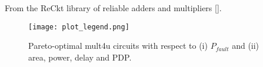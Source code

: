 \pagebreak

From the ReCkt library of reliable adders and multipliers [\cite{reckt_2021_umar}].

\begin{figure*}[htb]
\centering
{}
\hfil
{}
\hfil
\texttt{[image: plot\_legend.png]}
\caption{Pareto-optimal mult4u circuits with respect to (i) $P_{fault}$ and (ii) area, power, delay and PDP.}
\end{figure*}

\pagebreak
